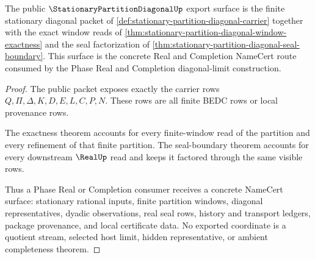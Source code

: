 \begin{theorem}
\label{thm:stationary-partition-diagonal-public-export}
The public $\StationaryPartitionDiagonalUp$ export surface is the finite stationary diagonal packet of \autoref{def:stationary-partition-diagonal-carrier} together with the exact window reads of \autoref{thm:stationary-partition-diagonal-window-exactness} and the seal factorization of \autoref{thm:stationary-partition-diagonal-seal-boundary}. This surface is the concrete Real and Completion NameCert route consumed by the Phase Real and Completion diagonal-limit construction.
\end{theorem}
\begin{proof}
The public packet exposes exactly the carrier rows $Q,\Pi,\Delta,K,D,E,L,C,P,N$. These rows are all finite BEDC rows or local provenance rows.

The exactness theorem accounts for every finite-window read of the partition and every refinement of that finite partition. The seal-boundary theorem accounts for every downstream $\RealUp$ read and keeps it factored through the same visible rows.

Thus a Phase Real or Completion consumer receives a concrete NameCert surface: stationary rational inputs, finite partition windows, diagonal representatives, dyadic observations, real seal rows, history and transport ledgers, package provenance, and local certificate data. No exported coordinate is a quotient stream, selected host limit, hidden representative, or ambient completeness theorem.
\end{proof}

